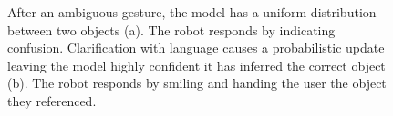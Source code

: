 \documentclass[a4paper, 11pt]{article} %
\begin{document}
\begin{figure}[h]
\centering
{}
\caption{After an ambiguous gesture, the model has a uniform
  distribution between two objects (a).  The robot responds by
  indicating confusion.  Clarification with language causes a
  probabilistic update leaving the model highly confident it has
  inferred the correct object (b).  The robot responds by smiling and handing the user the object they referenced. \label{fig:cartoon}}
\end{figure}
\end{document}
